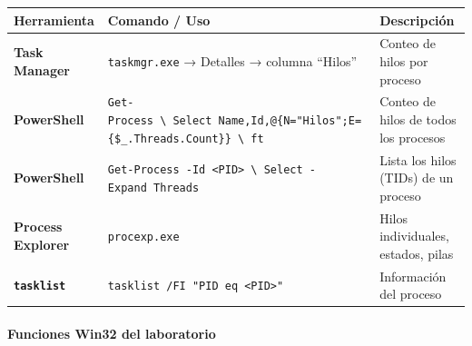 \documentclass[
  spanish,
]{article}
\newcounter{none} %
\begin{document}
{\def\LTcaptype{none} %
\begin{longtable}[]{@{}
  >{\raggedright\arraybackslash}p{}
  >{\raggedright\arraybackslash}p{}
  >{\raggedright\arraybackslash}p{}@{}}
\toprule\noalign{}
\begin{minipage}[b]{\linewidth}\raggedright
Herramienta
\end{minipage} & \begin{minipage}[b]{\linewidth}\raggedright
Comando / Uso
\end{minipage} & \begin{minipage}[b]{\linewidth}\raggedright
Descripción
\end{minipage} \\
\midrule\noalign{}
\endhead
\bottomrule\noalign{}
\endlastfoot
\textbf{Task Manager} & \texttt{taskmgr.exe} → Detalles → columna
``Hilos'' & Conteo de hilos por proceso \\
\textbf{PowerShell} &
\texttt{Get-Process\ \textbackslash{}\textbar{}\ Select\ Name,Id,@\{N="Hilos";E=\{\$\_.Threads.Count\}\}\ \textbackslash{}\textbar{}\ ft}
& Conteo de hilos de todos los procesos \\
\textbf{PowerShell} &
\texttt{Get-Process\ -Id\ \textless{}PID\textgreater{}\ \textbackslash{}\textbar{}\ Select\ -Expand\ Threads}
& Lista los hilos (TIDs) de un proceso \\
\textbf{Process Explorer} & \texttt{procexp.exe} & Hilos individuales,
estados, pilas \\
\textbf{\texttt{tasklist}} &
\texttt{tasklist\ /FI\ "PID\ eq\ \textless{}PID\textgreater{}"} &
Información del proceso \\
\end{longtable}
}

\paragraph{Funciones Win32 del
laboratorio}\label{funciones-win32-del-laboratorio}
\end{document}
